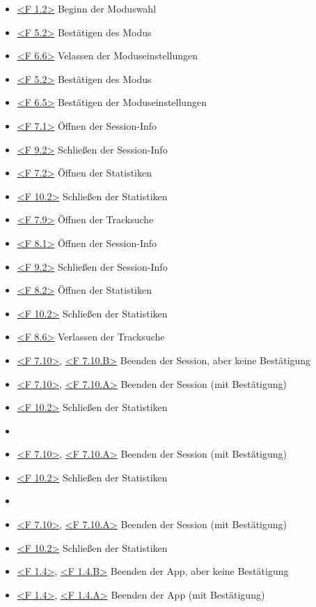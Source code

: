 \documentclass[oneside, ngerman]{sdqtechreport}
\begin{document}
\begin{itemize}
    \item \hyperlink{<F 1.2>}{<F 1.2>} Beginn der Moduswahl
    \item \hyperlink{<F 5.2>}{<F 5.2>} Bestätigen des Modus
    \item \hyperlink{<F 6.6>}{<F 6.6>} Velassen der Moduseinstellungen
    \item \hyperlink{<F 5.2>}{<F 5.2>} Bestätigen des Modus
    \item \hyperlink{<F 6.5>}{<F 6.5>} Bestätigen der Moduseinstellungen
    \item \hyperlink{<F 7.1>}{<F 7.1>} Öffnen der Session-Info
    \item \hyperlink{<F 9.2>}{<F 9.2>} Schließen der Session-Info
    \item \hyperlink{<F 7.2>}{<F 7.2>} Öffnen der Statistiken
    \item \hyperlink{<F 10.2>}{<F 10.2>} Schließen der Statistiken
    \item \hyperlink{<F 7.9>}{<F 7.9>} Öffnen der Tracksuche
    \item \hyperlink{<F 8.1>}{<F 8.1>} Öffnen der Session-Info
    \item \hyperlink{<F 9.2>}{<F 9.2>} Schließen der Session-Info
    \item \hyperlink{<F 8.2>}{<F 8.2>} Öffnen der Statistiken
    \item \hyperlink{<F 10.2>}{<F 10.2>} Schließen der Statistiken
    \item \hyperlink{<F 8.6>}{<F 8.6>} Verlassen der Tracksuche
    \item \hyperlink{<F 7.10>}{<F 7.10>}, \hyperlink{<F 7.10.B>}{<F 7.10.B>} Beenden der Session, aber keine Bestätigung
    \item \hyperlink{<F 7.10>}{<F 7.10>}, \hyperlink{<F 7.10.A>}{<F 7.10.A>} Beenden der Session (mit Bestätigung)
    \item \hyperlink{<F 10.2>}{<F 10.2>} Schließen der Statistiken
    \item \gThirteen
    \item \hyperlink{<F 7.10>}{<F 7.10>}, \hyperlink{<F 7.10.A>}{<F 7.10.A>} Beenden der Session (mit Bestätigung)
    \item \hyperlink{<F 10.2>}{<F 10.2>} Schließen der Statistiken
    \item \gFourteen
    \item \hyperlink{<F 7.10>}{<F 7.10>}, \hyperlink{<F 7.10.A>}{<F 7.10.A>} Beenden der Session (mit Bestätigung)
    \item \hyperlink{<F 10.2>}{<F 10.2>} Schließen der Statistiken
    \item \hyperlink{<F 1.4>}{<F 1.4>}, \hyperlink{<F 1.4.B>}{<F 1.4.B>}  Beenden der App, aber keine Bestätigung
    \item \hyperlink{<F 1.4>}{<F 1.4>}, \hyperlink{<F 1.4.A>}{<F 1.4.A>} Beenden der App (mit Bestätigung)
\end{itemize}
\end{document}
